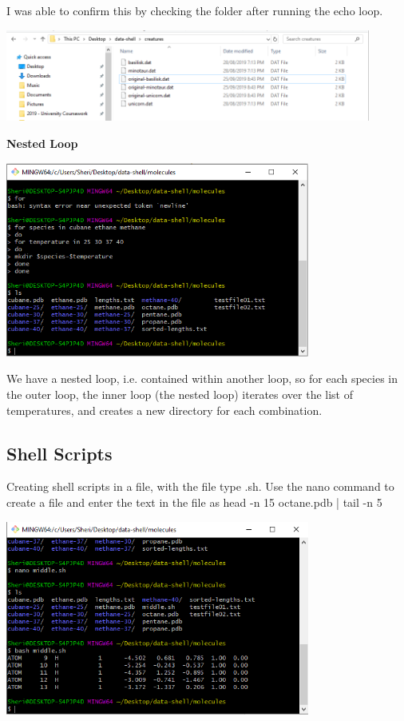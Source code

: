 \documentclass{article}
\begin{document}
I was able to confirm this by checking the folder after running the echo loop. 

\includegraphics[width=12cm]{Images/GitBash_051.PNG}

\textbf{Nested Loop}

\includegraphics[width=10cm]{Images/GitBash_052.PNG}

We have a nested loop, i.e. contained within another loop, so for each species in the outer loop, the inner loop (the nested loop) iterates over the list of temperatures, and creates a new directory for each combination.

\subsection{Shell Scripts}

Creating shell scripts in a file, with the file type .sh.
Use the nano command to create a file and enter the text in the file as head -n 15 octane.pdb | tail -n 5

\includegraphics[width=10cm]{Images/GitBash_053.PNG}
\end{document}
